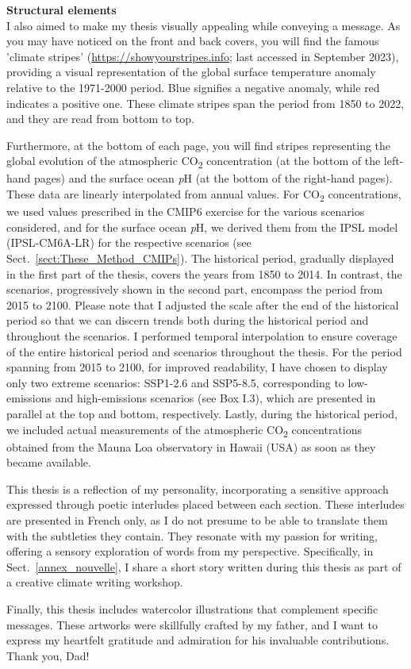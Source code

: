 {\noindent\Large\textbf{Structural elements}}
\\

I also aimed to make my thesis visually appealing while conveying a message. As you may have noticed on the front and back covers, you will find the famous 'climate stripes' (\url{https://showyourstripes.info}; last accessed in September 2023), providing a visual representation of the global surface temperature anomaly relative to the 1971-2000 period. Blue signifies a negative anomaly, while red indicates a positive one. These climate stripes span the period from 1850 to 2022, and they are read from bottom to top.

Furthermore, at the bottom of each page, you will find stripes representing the global evolution of the atmospheric CO\textsubscript{2} concentration (at the bottom of the left-hand pages) and the surface ocean \textit{p}H (at the bottom of the right-hand pages). These data are linearly interpolated from annual values. For CO\textsubscript{2} concentrations, we used values prescribed in the CMIP6 exercise for the various scenarios considered, and for the surface ocean \textit{p}H, we derived them from the IPSL model (IPSL-CM6A-LR) for the respective scenarios (see Sect.~\ref{sect:These_Method_CMIPs}). The historical period, gradually displayed in the first part of the thesis, covers the years from 1850 to 2014. In contrast, the scenarios, progressively shown in the second part, encompass the period from 2015 to 2100. Please note that I adjusted the scale after the end of the historical period so that we can discern trends both during the historical period and throughout the scenarios. I performed temporal interpolation to ensure coverage of the entire historical period and scenarios throughout the thesis. For the period spanning from 2015 to 2100, for improved readability, I have chosen to display only two extreme scenarios: SSP1-2.6 and SSP5-8.5, corresponding to low-emissions and high-emissions scenarios (see Box I.3), which are presented in parallel at the top and bottom, respectively. Lastly, during the historical period, we included actual measurements of the atmospheric CO\textsubscript{2} concentrations obtained from the Mauna Loa observatory in Hawaii (USA) as soon as they became available.

This thesis is a reflection of my personality, incorporating a sensitive approach expressed through poetic interludes placed between each section. These interludes are presented in French only, as I do not presume to be able to translate them with the subtleties they contain. They resonate with my passion for writing, offering a sensory exploration of words from my perspective. Specifically, in Sect.~\ref{annex_nouvelle}, I share a short story written during this thesis as part of a creative climate writing workshop.

Finally, this thesis includes watercolor illustrations that complement specific messages. These artworks were skillfully crafted by my father, and I want to express my heartfelt gratitude and admiration for his invaluable contributions. Thank you, Dad!